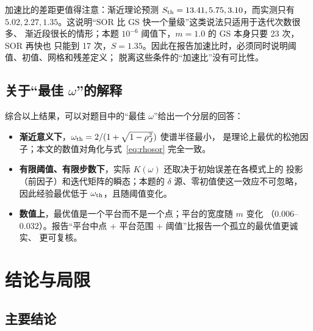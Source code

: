 \documentclass[UTF8,fontset=windows,a4paper,11pt]{ctexart}
\begin{document}
\begin{table}[htbp]
\centering
\caption{$N=63$ 时实验值与渐近理论值的比较。$K^{\rm asym}$ 由
式~\eqref{eq:kasym} 计算（$\epsilon=10^{-6}$）；$S_{\rm exp}=K_{\rm GS}/K_{\rm SOR}$，
$S_{\rm th}=K_{\rm GS}^{\rm asym}/K_{\rm SOR}^{\rm asym}$。}
\label{tab:theory}
\small

\end{table}

加速比的差距更值得注意：渐近理论预测 $S_{\rm th}=13.41,5.75,3.10$，而实测只有
$5.02,2.27,1.35$。这说明“SOR 比 GS 快一个量级”这类说法只适用于迭代次数很多、
渐近段很长的情形；本题 $10^{-6}$ 阈值下，$m=1.0$ 的 GS 本身只要 23 次，SOR 再快也
只能到 17 次，$S=1.35$。因此在报告加速比时，必须同时说明阈值、初值、网格和残差定义；
脱离这些条件的“加速比”没有可比性。

\subsection{关于“最佳 \texorpdfstring{$\omega$}{omega}”的解释}

综合以上结果，可以对题目中的“最佳 $\omega$”给出一个分层的回答：
\begin{itemize}[leftmargin=2.1em,itemsep=0.15em,topsep=0.2em]
\item \textbf{渐近意义下}，$\omega_{\rm th}=2/(1+\sqrt{1-\rho_J^2})$ 使谱半径最小，
是理论上最优的松弛因子；本文的数值对角化与式~\eqref{eq:rhosor} 完全一致。
\item \textbf{有限阈值、有限步数下}，实际 $K(\omega)$ 还取决于初始误差在各模式上的
投影（前因子）和迭代矩阵的瞬态；本题的 $\delta$ 源、零初值使这一效应不可忽略，
因此经验最优低于 $\omega_{\rm th}$，且随阈值变化。
\item \textbf{数值上}，最优值是一个平台而不是一个点；平台的宽度随 $m$ 变化
（$0.006$--$0.032$）。报告“平台中点 + 平台范围 + 阈值”比报告一个孤立的最优值更诚实、
更可复核。
\end{itemize}

\section{结论与局限}

\subsection{主要结论}
\end{document}

